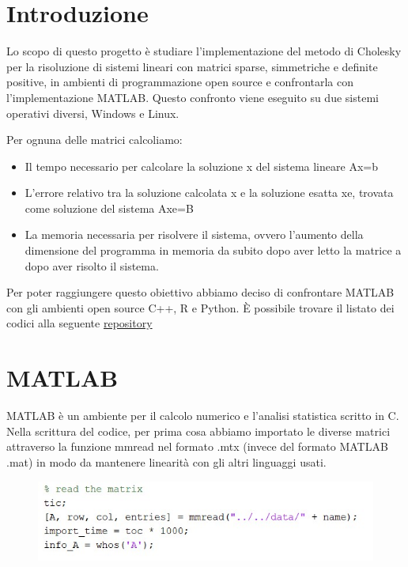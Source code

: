 \documentclass[a4paper,10pt]{article}
\begin{document}
\tableofcontents

\newpage

\section{Introduzione}

Lo scopo di questo progetto è studiare l’implementazione del metodo di Cholesky per la risoluzione di sistemi lineari con matrici sparse, simmetriche e deﬁnite positive, in ambienti di programmazione open source e confrontarla con l’implementazione MATLAB. Questo confronto viene eseguito su due sistemi operativi diversi, Windows e Linux.

Per ognuna delle matrici calcoliamo:
\begin{itemize}
\item Il tempo necessario per calcolare la soluzione x del sistema lineare Ax=b
\item L’errore relativo tra la soluzione calcolata x e la soluzione esatta xe, trovata come soluzione del sistema Axe=B
\item La memoria necessaria per risolvere il sistema, ovvero l’aumento della dimensione del programma in memoria da subito dopo aver letto la matrice a dopo aver risolto il sistema.
\end{itemize}

Per poter raggiungere questo obiettivo abbiamo deciso di confrontare MATLAB con gli ambienti open source C++, R e Python.
È possibile trovare il listato dei codici alla seguente \href{https://gitlab.com/okamiRvS/cholesky-computing}{repository}

\newpage

\section{MATLAB}

MATLAB è un ambiente per il calcolo numerico e l’analisi statistica scritto in C. 
Nella scrittura del codice, per prima cosa abbiamo importato le diverse matrici attraverso la funzione mmread nel formato .mtx  (invece del formato MATLAB .mat) in modo da mantenere linearità con gli altri linguaggi usati.


\begin{figure}[H]
\centering
\includegraphics[width=0.6\linewidth]{img/matlab1.jpg}
\label{fig:1}
\end{figure}
\end{document}
